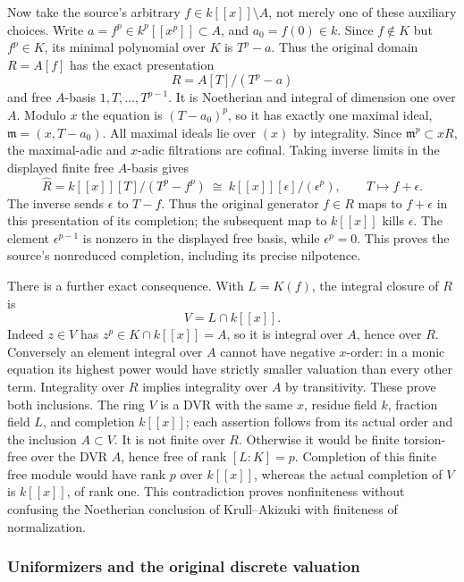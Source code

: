 Now take the source's arbitrary \(f\in k[[x]]\setminus A\), not merely one of these auxiliary choices. Write \(a=f^p\in k^p[[x^p]]\subset A\), and \(a_0=f(0)\in k\). Since \(f\notin K\) but \(f^p\in K\), its minimal polynomial over \(K\) is \(T^p-a\). Thus the original domain \(R=A[f]\) has the exact presentation \[
 R=A[T]/(T^p-a)
\] and free \(A\)-basis \(1,T,\ldots,T^{p-1}\). It is Noetherian and integral of dimension one over \(A\). Modulo \(x\) the equation is \((T-a_0)^p\), so it has exactly one maximal ideal, \(\mathfrak m=(x,T-a_0)\). All maximal ideals lie over \((x)\) by integrality. Since \(\mathfrak m^p\subset xR\), the maximal-adic and \(x\)-adic filtrations are cofinal. Taking inverse limits in the displayed finite free \(A\)-basis gives \[
 \widehat R=k[[x]][T]/(T^p-f^p)
       \ \cong\ k[[x]][\epsilon]/(\epsilon^p),\qquad T\longmapsto f+\epsilon.
\] The inverse sends \(\epsilon\) to \(T-f\). Thus the original generator \(f\in R\) maps to \(f+\epsilon\) in this presentation of its completion; the subsequent map to \(k[[x]]\) kills \(\epsilon\). The element \(\epsilon^{p-1}\) is nonzero in the displayed free basis, while \(\epsilon^p=0\). This proves the source's nonreduced completion, including its precise nilpotence.

There is a further exact consequence. With \(L=K(f)\), the integral closure of \(R\) is \[
 V=L\cap k[[x]].
\] Indeed \(z\in V\) has \(z^p\in K\cap k[[x]]=A\), so it is integral over \(A\), hence over \(R\). Conversely an element integral over \(A\) cannot have negative \(x\)-order: in a monic equation its highest power would have strictly smaller valuation than every other term. Integrality over \(R\) implies integrality over \(A\) by transitivity. These prove both inclusions. The ring \(V\) is a DVR with the same \(x\), residue field \(k\), fraction field \(L\), and completion \(k[[x]]\); each assertion follows from its actual order and the inclusion \(A\subset V\). It is not finite over \(R\). Otherwise it would be finite torsion-free over the DVR \(A\), hence free of rank \([L:K]=p\). Completion of this finite free module would have rank \(p\) over \(k[[x]]\), whereas the actual completion of \(V\) is \(k[[x]]\), of rank one. This contradiction proves nonfiniteness without confusing the Noetherian conclusion of Krull--Akizuki with finiteness of normalization.

\subsubsection{Uniformizers and the original discrete valuation}\label{uniformizers-and-the-original-discrete-valuation}

